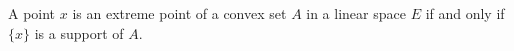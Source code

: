 A point $x$ is an extreme point of a convex set $A$ in a linear space $E$ if and only if $\{x\}$ is a support of $A$.
